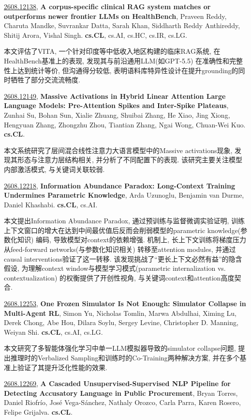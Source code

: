 \documentclass[9pt, a4paper]{article}
\theoremstyle{plain}
\theoremstyle{definition}
\theoremstyle{remark}
\newcommand{\arxivwithtarget}[3]{\hypertarget{#1}{}\href{https://arxiv.org/abs/#1}{#1}, \textbf{\textcolor{arxivblue}{#2}}, #3. }
\begin{document}
\arxivwithtarget{2608.12138}{A corpus-specific clinical RAG system matches or outperforms newer frontier LLMs on HealthBench}{Praveen Reddy, Charuta Mandke, Suvrankar Datta, Sarah Khan, Siddharth Reddy Anthireddy, Shitij Arora, Vishal Singh}\textbf{cs.CL}, cs.AI, cs.HC, cs.IR, cs.LG.

本文评估了VITA, 一个针对印度等中低收入地区构建的临床RAG系统, 在HealthBench基准上的表现, 发现其与前沿通用LLM(如GPT-5.5) 在准确性和完整性上达到统计等价, 但沟通得分较低, 表明语料库特异性设计在提升grounding的同时牺牲了部分交流流畅度.


\arxivwithtarget{2608.12149}{Massive Activations in Hybrid Linear Attention Large Language Models: Pre-Attention Spikes and Inter-Spike Plateaus}{Zunhai Su, Bohan Sun, Xialie Zhuang, Shuibai Zhang, He Xiao, Jing Xiong, Hengyuan Zhang, Zhongzhu Zhou, Tiantian Zhang, Ngai Wong, Chuan-Wei Kuo}\textbf{cs.CL}.

本文系统研究了层间混合线性注意力大语言模型中的Massive activations现象, 发现其形态与注意力层结构相关, 并分析了不同配置下的表现. 该研究主要关注模型内部激活模式, 与关键词关联较弱.


\arxivwithtarget{2608.12218}{Information Abundance Paradox: Long-Context Training Undermines Parametric Knowledge}{Arda Uzunoglu, Benjamin van Durme, Daniel Khashabi}\textbf{cs.CL}, cs.AI.

本文提出Information Abundance Paradox, 通过预训练与监督微调实验证明, 训练上下文窗口的增大在达到中间最优值后反而会削弱模型的parametric knowledge(参数化知识) 编码, 导致模型对context的依赖增强. 机制上, 长上下文训练将梯度压力从feed-forward networks(与参数化知识相关) 转移至attention modules, 并通过causal interventions验证了这一转移. 该发现挑战了“更长上下文必然有益”的隐含假设, 为理解context window与模型学习模式(parametric internalization vs. contextualization) 的权衡提供了开创性视角, 与关键词context和attention高度契合.


\arxivwithtarget{2608.12253}{One Frozen Simulator Is Not Enough: Simulator Collapse in Multi-Agent RL}{Simon Yu, Nicholas Tomlin, Marwa Abdulhai, Ximing Lu, Derek Chong, Abe Hou, Dilara Soylu, Sergey Levine, Christopher D. Manning, Weiyan Shi}\textbf{cs.CL}, cs.AI, cs.LG.

本文研究了多智能体强化学习中单一LLM模拟器导致的simulator collapse问题, 提出推理时的Verbalized Sampling和训练时的Co-Training两种解决方案, 并在多个基准上验证了其提升泛化性能的效果.


\arxivwithtarget{2608.12269}{A Cascaded Unsupervised-Supervised NLP Pipeline for Detecting Accusatory Language in Public Procurement}{Bryan Torres, Daniel Riofrío, José Vega-Sánchez, Nathaly Orozco, Carla Parra, Karen Rosero, Felipe Grijalva}\textbf{cs.CL}.
\end{document}
